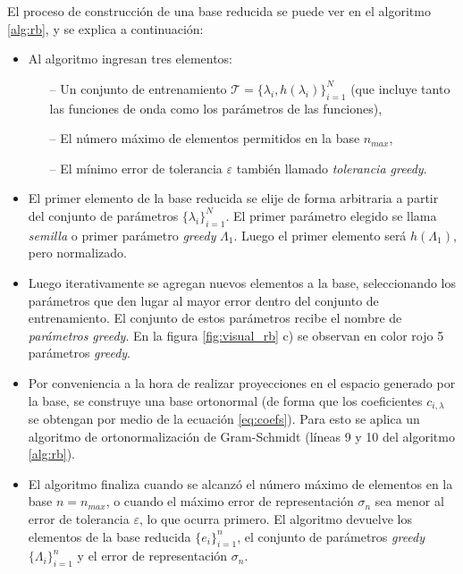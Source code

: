 El proceso de construcción de una base reducida se puede ver en el algoritmo \ref{alg:rb}, y se explica a continuación:

\begin{itemize}
\item Al algoritmo ingresan tres elementos:
	\begin{itemize}
	\item [--] Un conjunto de entrenamiento $\mathcal{T} = \{ \lambda_{i}, h(\lambda_i) \}_{i=1}^N$ (que incluye tanto las funciones de onda como los parámetros de las funciones), 
	\item[--] El número máximo de elementos permitidos en la base $n_{max}$,
	\item[--] El mínimo error de tolerancia $\varepsilon$ también llamado \textit{tolerancia greedy}.
	\end{itemize}

\item El primer elemento de la base reducida se elije de forma arbitraria a partir del conjunto de parámetros $\{\lambda_{i}\}_{i=1}^N$. El primer parámetro elegido se llama \textit{semilla} o primer parámetro \textit{greedy} $\Lambda_1$. Luego el primer elemento será $h(\Lambda_1)$, pero normalizado.
\item Luego iterativamente se agregan nuevos elementos a la base, seleccionando los parámetros que den lugar al mayor error dentro del conjunto de entrenamiento. El conjunto de estos parámetros recibe el nombre de \textit{parámetros greedy}.
En la figura \ref{fig:visual_rb} c) se observan en color rojo 5 parámetros \textit{greedy}.

\item Por conveniencia a la hora de realizar proyecciones en el espacio generado por la base, se construye una base ortonormal (de forma que los coeficientes $c_{i,\lambda}$ se obtengan por medio de la ecuación \eqref{eq:coefs}). Para esto se aplica un algoritmo de ortonormalización de Gram-Schmidt (líneas 9 y 10 del algoritmo \ref{alg:rb}).
\item El algoritmo finaliza cuando se alcanzó el número máximo de elementos en la base $n = n_{max}$, o cuando el máximo error de representación $\sigma_n$ sea menor al error de tolerancia $\varepsilon$, lo que ocurra primero. El algoritmo devuelve los elementos de la base reducida $\{ e_i\}_{i=1}^{n}$, el conjunto de parámetros \textit{greedy} $\{\Lambda_i\}_{i=1}^{n}$ y el error de representación $\sigma_n$.
\end{itemize}

